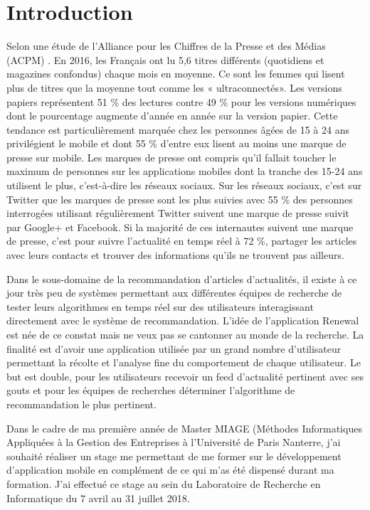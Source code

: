 \chapter*{Introduction}
\label{chap:introduction}

Selon une étude de l'Alliance pour les Chiffres de la Presse et des Médias (ACPM) \cite{oneGlobal}. En 2016, les Français ont lu 5,6 titres différents (quotidiens et magazines confondus) chaque mois en moyenne. Ce sont les femmes qui lisent plus de titres que la moyenne tout comme les « ultraconnectés». Les versions papiers représentent 51 \% des lectures contre 49 \% pour les versions numériques dont le pourcentage augmente d'année en année sur la version papier. Cette tendance est particulièrement marquée chez les personnes âgées de 15 à 24 ans privilégient le mobile et dont 55 \% d'entre eux lisent au moins une marque de presse sur mobile. Les marques de presse ont compris qu'il fallait toucher le maximum de personnes sur les applications mobiles dont la tranche des 15-24 ans utilisent le plus, c’est-à-dire les réseaux sociaux. Sur les réseaux sociaux, c'est sur Twitter que les marques de presse sont les plus suivies avec 55 \% des personnes interrogées utilisant régulièrement Twitter suivent une marque de presse suivit par Google+ et Facebook. Si la majorité de ces internautes suivent une marque de presse, c'est pour suivre l'actualité en temps réel à 72 \%, partager les articles avec leurs contacts et trouver des informations qu'ils ne trouvent pas ailleurs.  

Dans le sous-domaine de la recommandation d’articles d’actualités, il existe à ce jour très peu de systèmes permettant aux différentes équipes de recherche de tester leurs algorithmes en temps réel sur des utilisateurs interagissant directement avec le système de recommandation. L'idée de l'application Renewal est née de ce constat mais ne veux pas se cantonner au monde de la recherche. La finalité est d'avoir une application utilisée par un grand nombre d'utilisateur permettant la récolte et l'analyse fine du comportement de chaque  utilisateur. Le but est double, pour les utilisateurs recevoir un feed d'actualité pertinent avec ses gouts et pour les équipes de recherches déterminer l'algorithme de recommandation le plus pertinent.  

Dans le cadre de ma première année de Master MIAGE (Méthodes Informatiques Appliquées à la Gestion des Entreprises à l'Université de Paris Nanterre, j'ai souhaité réaliser un stage me permettant de me former sur le développement d'application mobile en complément de ce qui m'as été dispensé durant ma formation. J'ai effectué ce stage au sein du Laboratoire de Recherche en Informatique du 7 avril au 31 juillet 2018. 

